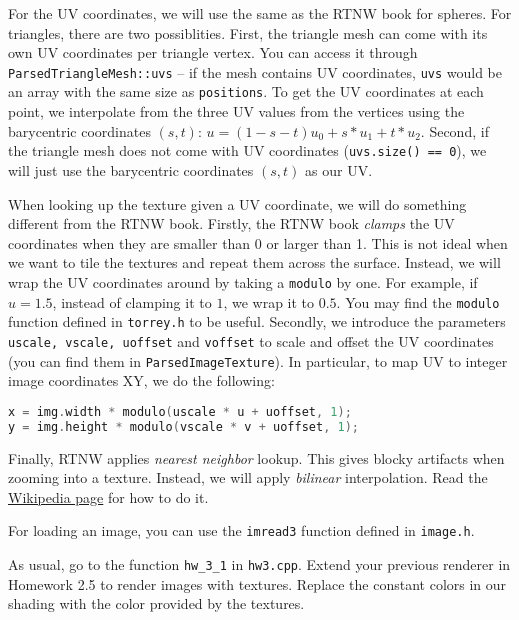For the UV coordinates, we will use the same as the RTNW book for spheres. For triangles, there are two possiblities. First, the triangle mesh can come with its own UV coordinates per triangle vertex. You can access it through \lstinline{ParsedTriangleMesh::uvs} -- if the mesh contains UV coordinates, \lstinline{uvs} would be an array with the same size as \lstinline{positions}. To get the UV coordinates at each point, we interpolate from the three UV values from the vertices using the barycentric coordinates $(s, t)$: $u = (1 - s - t)u_0 + s * u_1 + t * u_2$.
Second, if the triangle mesh does not come with UV coordinates (\lstinline{uvs.size() == 0}), we will just use the barycentric coordinates $(s, t)$ as our UV.

When looking up the texture given a UV coordinate, we will do something different from the RTNW book. Firstly, the RTNW book \emph{clamps} the UV coordinates when they are smaller than 0 or larger than 1. This is not ideal when we want to tile the textures and repeat them across the surface. Instead, we will wrap the UV coordinates around by taking a \lstinline{modulo} by one. For example, if $u = 1.5$, instead of clamping it to $1$, we wrap it to $0.5$. You may find the \lstinline{modulo} function defined in \lstinline{torrey.h} to be useful. Secondly, we introduce the parameters \lstinline{uscale, vscale, uoffset} and \lstinline{voffset} to scale and offset the UV coordinates (you can find them in \lstinline{ParsedImageTexture}). In particular, to map UV to integer image coordinates XY, we do the following:
\begin{lstlisting}[language=C++]
x = img.width * modulo(uscale * u + uoffset, 1);
y = img.height * modulo(vscale * v + uoffset, 1);
\end{lstlisting}
Finally, RTNW applies \emph{nearest neighbor} lookup. This gives blocky artifacts when zooming into a texture. Instead, we will apply \emph{bilinear} interpolation. Read the \href{https://en.wikipedia.org/wiki/Bilinear_interpolation}{Wikipedia page} for how to do it.

For loading an image, you can use the \lstinline{imread3} function defined in \lstinline{image.h}.

As usual, go to the function \lstinline{hw_3_1} in \lstinline{hw3.cpp}. Extend your previous renderer in Homework 2.5 to render images with textures. Replace the constant colors in our shading with the color provided by the textures.

